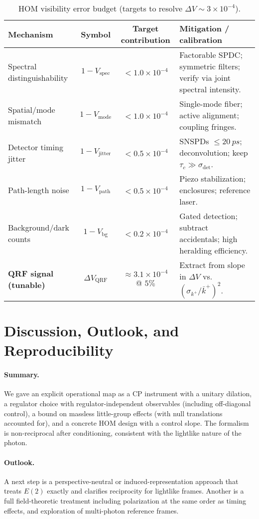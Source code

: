 \documentclass[aps,11pt]{article}
\newcommand{\kplus}{k^{+}}
\newcommand{\kbar}{\bar{k}^{+}}
\begin{document}
\begin{table}[t]
\centering
\caption{HOM visibility error budget (targets to resolve \(\Delta V\sim 3\times 10^{-4}\)).}
\label{tab:budget}
\begin{tabular}{@{}lccp{7.5cm}@{}}
\toprule
Mechanism & Symbol & Target contribution & Mitigation / calibration \\
\midrule
Spectral distinguishability & \(1-V_{\text{spec}}\) & \(<1.0\times10^{-4}\) & Factorable SPDC; symmetric filters; verify via joint spectral intensity. \\
Spatial/mode mismatch & \(1-V_{\text{mode}}\) & \(<1.0\times10^{-4}\) & Single-mode fiber; active alignment; coupling fringes. \\
Detector timing jitter & \(1-V_{\text{jitter}}\) & \(<0.5\times10^{-4}\) & SNSPDs \(\le 20~\si{ps}\); deconvolution; keep \(\tau_c\gg\sigma_{\text{det}}\). \\
Path-length noise & \(1-V_{\text{path}}\) & \(<0.5\times10^{-4}\) & Piezo stabilization; enclosures; reference laser. \\
Background/dark counts & \(1-V_{\text{bg}}\) & \(<0.2\times10^{-4}\) & Gated detection; subtract accidentals; high heralding efficiency. \\
\midrule
\textbf{QRF signal (tunable)} & \(\Delta V_{\text{QRF}}\) & \(\approx3.1\times10^{-4}\) @ \(5\%\) & Extract from slope in \(\Delta V\) vs.~\((\sigma_{\kplus}/\kbar)^2\). \\
\bottomrule
\end{tabular}
\end{table}

\section{Discussion, Outlook, and Reproducibility}\label{sec:discussion}
\paragraph{Summary.} We gave an explicit operational map as a CP instrument with a unitary dilation, a regulator choice with regulator-independent observables (including off-diagonal control), a bound on massless little-group effects (with null translations accounted for), and a concrete HOM design with a control slope. The formalism is non-reciprocal after conditioning, consistent with the lightlike nature of the photon.

\paragraph{Outlook.} A next step is a perspective-neutral or induced-representation approach that treats \(E(2)\) exactly and clarifies reciprocity for lightlike frames. Another is a full field-theoretic treatment including polarization at the same order as timing effects, and exploration of multi-photon reference frames.
\end{document}
